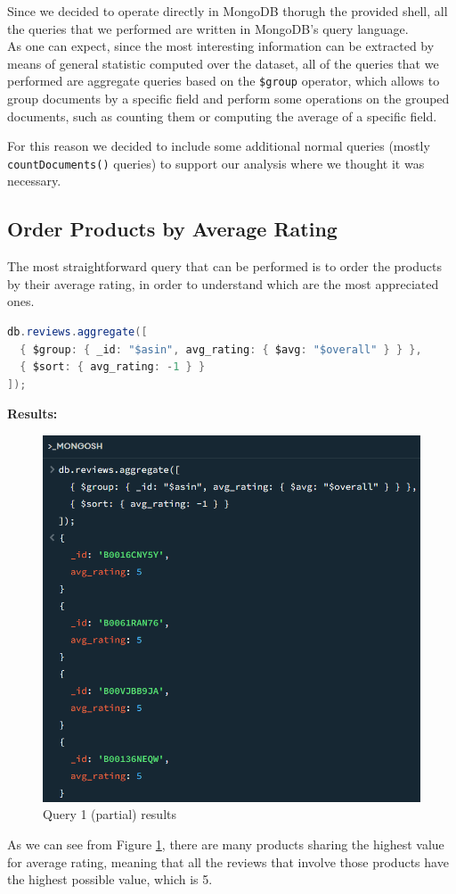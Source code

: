 Since we decided to operate directly in MongoDB thorugh the provided shell, all the queries that we performed are written in MongoDB's query language. \\

As one can expect, since the most interesting information can be extracted by means of general statistic computed over the dataset, all of the queries that we performed are aggregate queries based on the \texttt{\$group} operator, which allows to group documents by a specific field and perform some operations on the grouped documents, such as counting them or computing the average of a specific field.

For this reason we decided to include some additional normal queries (mostly \texttt{countDocuments()} queries) to support our analysis where we thought it was necessary. \\

\subsection{Order Products by Average Rating}
The most straightforward query that can be performed is to order the products by their average rating, in order to understand which are the most appreciated ones. \\
\begin{lstlisting}[language=Java]
db.reviews.aggregate([
  { $group: { _id: "$asin", avg_rating: { $avg: "$overall" } } },
  { $sort: { avg_rating: -1 } }
]);
\end{lstlisting}
\newpage
\textbf{Results:}
\begin{figure}[H]
  \centering
  \includegraphics[scale=0.6]{Images/q1_result.png}
  \caption{Query 1 (partial) results}
  \label{fig:q1_result}
\end{figure}
As we can see from Figure \ref{fig:q1_result}, there are many products sharing the highest value for average rating, meaning that all the reviews that involve those products have the highest possible value, which is 5.\\

